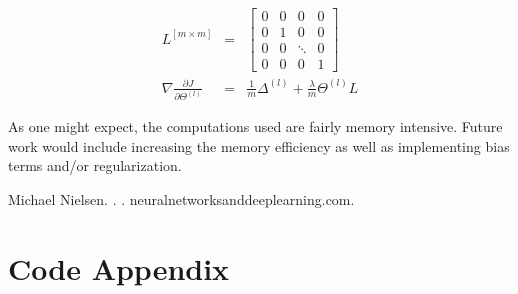 \documentclass[11pt]{article}
\begin{document}
\begin{align*}
	L^{[m \times m]} & = & \begin{bmatrix} 
	0 & 0 & 0      & 0               \\
	0 & 1 & 0      & 0               \\ 
	0 & 0 & \ddots & 0               \\ 
	0 & 0 & 0      & 1 \end{bmatrix} \\ 
	\nabla\frac{\partial J}{\partial\Theta^{(l)}} & = & \frac{1}{m} \Delta^{(l)} + \frac{\lambda}{m}\Theta^{(l)}L
\end{align*}

As one might expect, the computations used are fairly memory intensive. Future work would include increasing the memory efficiency as well as implementing bias terms and/or regularization.

%
%

\begin{thebibliography}{}
			
	Michael Nielsen.
	.
	.
	\newblock neuralnetworksanddeeplearning.com.
			
\end{thebibliography}

\newpage
\onecolumn
\section*{Code Appendix}

\end{document}
